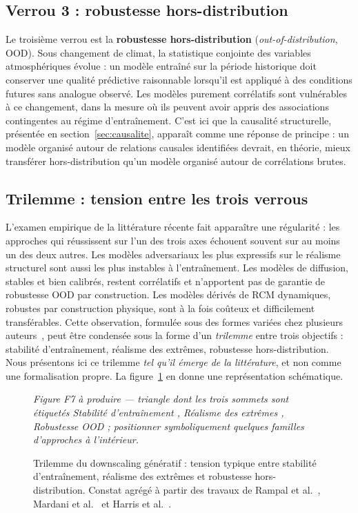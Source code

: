 \documentclass[14pt,a4paper,openany]{extreport}
\theoremstyle{definition}
\newcommand{\figplaceholder}[2][0.9\linewidth]{%
  \begin{tcolorbox}[width=#1,height=5cm,valign=center,colback=gray!8,colframe=gray!45,arc=2pt,boxrule=0.5pt]
    \centering\small\textit{#2}
  \end{tcolorbox}%
}
\begin{document}
\subsection{Verrou 3 : robustesse hors-distribution}
\label{ssec:verrou-ood}

Le troisième verrou est la \textbf{robustesse hors-distribution} (\emph{out-of-distribution}, OOD). Sous changement de climat, la statistique conjointe des variables atmosphériques évolue : un modèle entraîné sur la période historique doit conserver une qualité prédictive raisonnable lorsqu'il est appliqué à des conditions futures sans analogue observé. Les modèles purement corrélatifs sont vulnérables à ce changement, dans la mesure où ils peuvent avoir appris des associations contingentes au régime d'entraînement. C'est ici que la causalité structurelle, présentée en section~\ref{sec:causalite}, apparaît comme une réponse de principe : un modèle organisé autour de relations causales identifiées devrait, en théorie, mieux transférer hors-distribution qu'un modèle organisé autour de corrélations brutes.

\subsection{Trilemme : tension entre les trois verrous}
\label{ssec:trilemme}

L'examen empirique de la littérature récente fait apparaître une régularité : les approches qui réussissent sur l'un des trois axes échouent souvent sur au moins un des deux autres. Les modèles adversariaux les plus expressifs sur le réalisme structurel sont aussi les plus instables à l'entraînement. Les modèles de diffusion, stables et bien calibrés, restent corrélatifs et n'apportent pas de garantie de robustesse OOD par construction. Les modèles dérivés de RCM dynamiques, robustes par construction physique, sont à la fois coûteux et difficilement transférables. Cette observation, formulée sous des formes variées chez plusieurs auteurs~\cite{rampal_cgan_2024,mardani_corrdiff_2023,harris_2022}, peut être condensée sous la forme d'un \emph{trilemme} entre trois objectifs : stabilité d'entraînement, réalisme des extrêmes, robustesse hors-distribution. Nous présentons ici ce trilemme \emph{tel qu'il émerge de la littérature}, et non comme une formalisation propre. La figure~\ref{fig:trilemme} en donne une représentation schématique.

\begin{figure}[ht]
  \centering
  \figplaceholder[0.65\linewidth]{Figure F7 à produire --- triangle dont les trois sommets sont étiquetés \og Stabilité d'entraînement \fg{}, \og Réalisme des extrêmes \fg{}, \og Robustesse OOD \fg{} ; positionner symboliquement quelques familles d'approches à l'intérieur.}
  \caption{Trilemme du downscaling génératif : tension typique entre stabilité d'entraînement, réalisme des extrêmes et robustesse hors-distribution. Constat agrégé à partir des travaux de Rampal et al.~\cite{rampal_cgan_2024}, Mardani et al.~\cite{mardani_corrdiff_2023} et Harris et al.~\cite{harris_2022}.}
  \label{fig:trilemme}
\end{figure}
\end{document}
